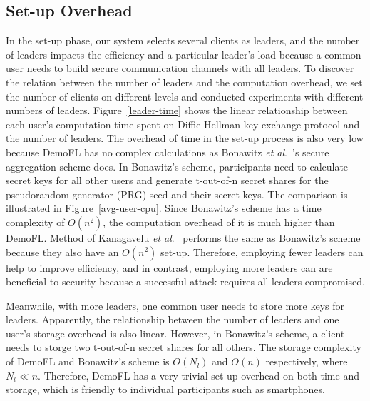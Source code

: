 \subsection{Set-up Overhead}
In the set-up phase, our system selects several clients as leaders, and the number of leaders impacts the efficiency and a particular leader's load because a common user needs to build secure communication channels with all leaders. To discover the relation between the number of leaders and the computation overhead, we set the number of clients on different levels and conducted experiments with different numbers of leaders. Figure~\ref{leader-time} shows the linear relationship between each user's computation time spent on Diffie Hellman key-exchange protocol and the number of leaders. The overhead of time in the set-up process is also very low because DemoFL has no complex calculations as Bonawitz \emph{et al}.~\cite{Practical}'s secure aggregation scheme does. In Bonawitz's scheme, participants need to calculate secret keys for all other users and generate t-out-of-n secret shares for the pseudorandom generator (PRG) seed and their secret keys. The comparison is illustrated in Figure~\ref{avg-user-cpu}. Since Bonawitz's scheme has a time complexity of $O(n^2)$, the computation overhead of it is much higher than DemoFL. Method of Kanagavelu \emph{et al}.~\cite{Two-Phase} performs the same as Bonawitz's scheme because they also have an $O(n^2)$ set-up. Therefore, employing fewer leaders can help to improve efficiency, and in contrast, employing more leaders can are beneficial to security because a successful attack requires all leaders compromised. 

Meanwhile, with more leaders, one common user needs to store more keys for leaders. Apparently, the relationship between the number of leaders and one user's storage overhead is also linear. However, in Bonawitz's scheme, a client needs to storge two t-out-of-n secret shares for all others. The storage complexity of DemoFL and Bonawitz's scheme is $O(N_l)$ and $O(n)$ respectively, where $N_l \ll n$. Therefore, DemoFL has a very trivial set-up overhead on both time and storage, which is friendly to individual participants such as smartphones.

